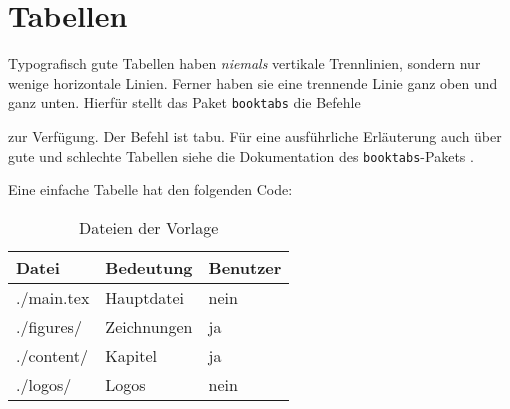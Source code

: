 \section{Tabellen}
\label{sec:Tabellen}

Typografisch gute Tabellen haben \emph{niemals} vertikale Trennlinien,
sondern nur wenige horizontale Linien.
Ferner haben sie eine trennende Linie ganz oben und ganz unten.
Hierfür stellt das Paket \texttt{booktabs} die Befehle
\begin{itemize*}
  \item {}
	\item {}
	\item {}
\end{itemize*}
zur Verfügung.
Der Befehl  ist tabu.
Für eine ausführliche Erläuterung auch über gute und schlechte Tabellen
siehe die Dokumentation des \texttt{booktabs}-Pakets \cite{Fear2005}.

Eine einfache Tabelle hat den folgenden Code:
\begin{latex}[caption={Einfache Tabelle in \LaTeX},label={lst:tables}]
\begin{table}%
  \centering%
  \begin{tabular}{l l l}%
	  \toprule%
    Datei       &  Bedeutung    &  Benutzer \\
		\midrule%
    ./main.tex  &  Hauptdatei   &  nein     \\
    ./figures/  &  Zeichnungen  &  ja       \\
    ./content/  &  Kapitel      &  ja       \\
    ./logos/    &  Logos        &  nein     \\
		\bottomrule%
  \end{tabular}%
  \caption{Dateien der Vorlage}%
  \label{tab:files-dirs-of-template}%
\end{table}
\end{latex}


